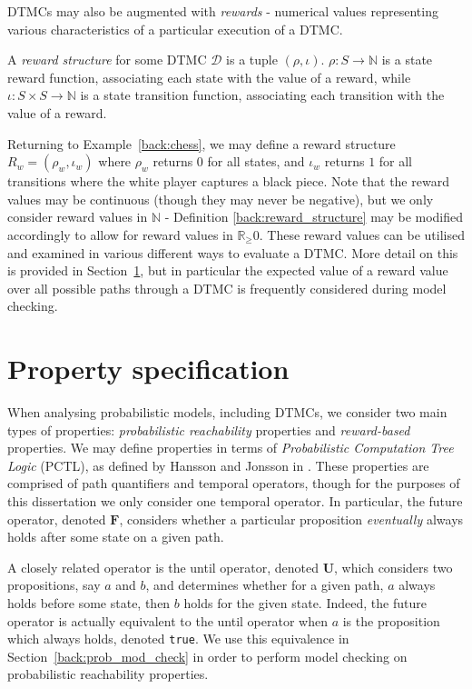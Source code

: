DTMCs may also be augmented with \emph{rewards} - numerical values representing various characteristics of a particular execution of a DTMC.

\begin{definition}
\label{back:reward_structure}

A \emph{reward structure} for some DTMC $\mathcal{D}$ is a tuple $(\rho, \iota)$. $\rho : S \rightarrow \mathbb{N}$ is a state reward function, associating each state with the value of a reward, while $\iota : S \times S \rightarrow \mathbb{N}$ is a state transition function, associating each transition with the value of a reward.
\end{definition}

Returning to Example~\ref{back:chess}, we may define a reward structure $R_w = (\rho_w, \iota_w)$ where $\rho_w$ returns $0$ for all states, and $\iota_w$ returns $1$ for all transitions where the white player captures a black piece. Note that the reward values may be continuous (though they may never be negative), but we only consider reward values in $\mathbb{N}$ - Definition \ref{back:reward_structure} may be modified accordingly to allow for reward values in $\mathbb{R}_\geq0$. These reward values can be utilised and examined in various different ways to evaluate a DTMC. More detail on this is provided in Section~\ref{back:prop_spec}, but in particular the expected value of a reward value over all possible paths through a DTMC is frequently considered during model checking.

\section{Property specification}
\label{back:prop_spec}

When analysing probabilistic models, including DTMCs, we consider two main types of properties: \emph{probabilistic reachability} properties and \emph{reward-based} properties. We may define properties in terms of \emph{Probabilistic Computation Tree Logic} (PCTL), as defined by Hansson and Jonsson in \cite{hansson_logic_1994}. These properties are comprised of path quantifiers and temporal operators, though for the purposes of this dissertation we only consider one temporal operator. In particular, the future operator, denoted $\mathbf{F}$, considers whether a particular proposition \emph{eventually} always holds after some state on a given path.

A closely related operator is the until operator, denoted  $\mathbf{U}$, which considers two propositions, say $a$ and $b$, and determines whether for a given path, $a$ always holds before some state, then $b$ holds for the given state. Indeed, the future operator is actually equivalent to the until operator when $a$ is the proposition which always holds, denoted \verb+true+. We use this equivalence in Section~\ref{back:prob_mod_check} in order to perform model checking on probabilistic reachability properties.

